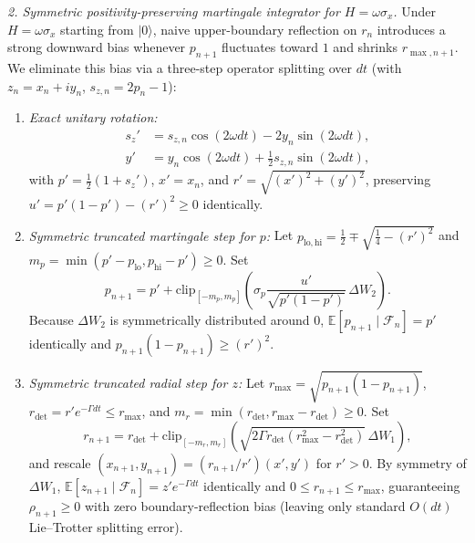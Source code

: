 \documentclass[aps,pra,10pt,twocolumn,superscriptaddress,amsmath,amssymb,floatfix]{revtex4-2}
\newcommand{\E}{\mathbb{E}}
\newcommand{\ket}[1]{|#1\rangle}
\begin{document}
\emph{2. Symmetric positivity-preserving martingale integrator for $H = \omega\sigma_x$.}
Under $H = \omega\sigma_x$ starting from $\ket{0}$, naive upper-boundary reflection on $r_n$ introduces a strong downward bias whenever $p_{n+1}$ fluctuates toward $1$ and shrinks $r_{\max,n+1}$. We eliminate this bias via a three-step operator splitting over $dt$ (with $z_n = x_n + i y_n$, $s_{z,n} = 2p_n - 1$):
\begin{enumerate}\setlength{\itemsep}{1pt}\setlength{\parskip}{0pt}
\item \emph{Exact unitary rotation:}
\begin{align*}
s_z' &= s_{z,n}\cos(2\omega dt) - 2y_n\sin(2\omega dt), \\
y' &= y_n\cos(2\omega dt) + \frac{1}{2}s_{z,n}\sin(2\omega dt),
\end{align*}
with $p' = \frac{1}{2}(1+s_z')$, $x'=x_n$, and $r' = \sqrt{(x')^2 + (y')^2}$, preserving $u' = p'(1-p')-(r')^2 \ge 0$ identically.
\item \emph{Symmetric truncated martingale step for $p$:} Let $p_{\mathrm{lo,hi}} = \frac{1}{2} \mp \sqrt{\frac{1}{4}-(r')^2}$ and $m_p = \min(p'-p_{\mathrm{lo}}, p_{\mathrm{hi}}-p') \ge 0$. Set
\begin{equation*}
p_{n+1} = p' + \mathrm{clip}_{[-m_p, m_p]}\!\left(\sigma_p \frac{u'}{\sqrt{p'(1-p')}}\,\Delta W_2\right).
\end{equation*}
Because $\Delta W_2$ is symmetrically distributed around $0$, $\E[p_{n+1}\mid\mathcal{F}_n] = p'$ identically and $p_{n+1}(1-p_{n+1}) \ge (r')^2$.
\item \emph{Symmetric truncated radial step for $z$:} Let $r_{\max} = \sqrt{p_{n+1}(1-p_{n+1})}$, $r_{\mathrm{det}} = r' e^{-\Gamma dt} \le r_{\max}$, and $m_r = \min(r_{\mathrm{det}}, r_{\max}-r_{\mathrm{det}}) \ge 0$. Set
\begin{equation*}
r_{n+1} = r_{\mathrm{det}} + \mathrm{clip}_{[-m_r, m_r]}\!\left(\sqrt{2\Gamma r_{\mathrm{det}}(r_{\max}^2 - r_{\mathrm{det}}^2)}\,\Delta W_1\right),
\end{equation*}
and rescale $(x_{n+1}, y_{n+1}) = (r_{n+1}/r')(x', y')$ for $r' > 0$. By symmetry of $\Delta W_1$, $\E[z_{n+1}\mid\mathcal{F}_n] = z' e^{-\Gamma dt}$ identically and $0 \le r_{n+1} \le r_{\max}$, guaranteeing $\rho_{n+1} \ge 0$ with zero boundary-reflection bias (leaving only standard $O(dt)$ Lie--Trotter splitting error).
\end{enumerate}
\end{document}
